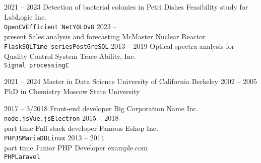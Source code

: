 \documentclass[9pt]{developercv} %
\begin{document}


\begin{entrylist}
	\entry
	{2021 -- 2023}
	{Detection of bacterial colonies in Petri Dishes}
	{Feasibility study for LabLogic Inc.}
	{\lorem\lorem\\ \texttt{OpenCV}\slashsep\texttt{Efficient Net}\slashsep\texttt{YOLOv8}}
	\entry
	{2023 -- \\\footnotesize{present}}
	{Sales analysis and forecasting}
	{McMaster Nuclear Reactor}
	{\lorem\lorem\\ \texttt{Flask}\slashsep\texttt{SQL}\slashsep\texttt{Time series}\slashsep\texttt{PostGreSQL}}
	\entry
	{2013 -- 2019}
	{Optical spectra analysis for Quality Control System}
	{Trace-Ability, Inc.}
	{\lorem\lorem\\ \texttt{Signal processing}\slashsep\texttt{C}}
\end{entrylist}



\begin{entrylist}
	\entry
	{2021 -- 2024}
	{Master in Data Science}
	{University of California Berkeley}
	{\lorem\lorem}
	\entry
	{2002 -- 2005}
	{PhD in Chemistry}
	{Moscow State University}
	{\lorem\lorem}
\end{entrylist}



\begin{entrylist}
	\entry
		{2017 -- 3/2018}
		{Front-end developer}
		{Big Corporation Name Inc.}
		{\lorem \lorem \lorem\\ \texttt{node.js}\slashsep\texttt{Vue.js}\slashsep\texttt{Electron}}
	\entry
		{2015 -- 2018\\\footnotesize{part time}}
		{Full stack developer}
		{Famous Eshop Inc.}
		{\lorem\lorem\\ \texttt{PHP}\slashsep\texttt{JS}\slashsep\texttt{MariaDB}\slashsep\texttt{Linux}}
	\entry
		{2013 -- 2014\\\footnotesize{part time}}
		{Junior PHP Developer}
		{example.com}
		{\lorem\lorem\\ \texttt{PHP}\slashsep\texttt{Laravel}}
\end{entrylist}
\end{document}
